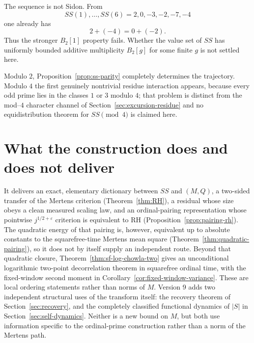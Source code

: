 \documentclass[11pt]{amsart}
\numberwithin{equation}{section}
\theoremstyle{plain}
\theoremstyle{definition}
\theoremstyle{remark}
\newcommand{\Mert}{M}
\newcommand{\Sq}{Q}
\begin{document}
The sequence is not Sidon.  From
\begin{equation}
\label{eq:first-SS-values-v9}
SS(1),\ldots,SS(6)=2,0,-3,-2,-7,-4
\end{equation}
one already has
\begin{equation}
\label{eq:ss-not-Sidon-witness}
2+(-4)=0+(-2).
\end{equation}
Thus the stronger $B_2[1]$ property fails.  Whether the value set of $SS$ has
uniformly bounded additive multiplicity $B_2[g]$ for some finite $g$ is not
settled here.

Modulo $2$, Proposition~\ref{prop:ss-parity} completely determines the
trajectory.  Modulo $4$ the first genuinely nontrivial residue interaction
appears, because every odd prime lies in the classes $1$ or $3$ modulo $4$;
that problem is distinct from the mod--$4$ character channel of
Section~\ref{sec:excursion-residue} and no equidistribution theorem for
$SS\pmod4$ is claimed here.

\section{What the construction does and does not deliver}
\label{sec:deliverables}

It delivers an exact, elementary dictionary between $SS$ and $(\Mert,\Sq)$, a
two-sided transfer of the Mertens criterion (Theorem~\ref{thm:RH}), a
residual whose size obeys a clean measured scaling law, and an ordinal-pairing
representation whose pointwise $j^{1/2+\varepsilon}$ criterion is equivalent to RH
(Proposition~\ref{prop:pairing-rh}).  The quadratic energy of that pairing is,
however, equivalent up to absolute constants to the squarefree-time Mertens
mean square (Theorem~\ref{thm:quadratic-pairing}), so it does not by itself
supply an independent route.  Beyond that quadratic closure,
Theorem~\ref{thm:sf-log-chowla-two} gives an unconditional logarithmic
two-point decorrelation theorem in squarefree ordinal time, with the fixed-window
second moment in Corollary~\ref{cor:fixed-window-variance}.  These are local
ordering statements rather than norms of $M$.  Version 9 adds two independent
structural uses of the transform itself: the recovery theorem of
Section~\ref{sec:recovery}, and the completely classified functional dynamics
of $|S|$ in Section~\ref{sec:self-dynamics}.  Neither is a new bound on $M$,
but both use information specific to the ordinal-prime construction rather than
a norm of the Mertens path.
\end{document}
